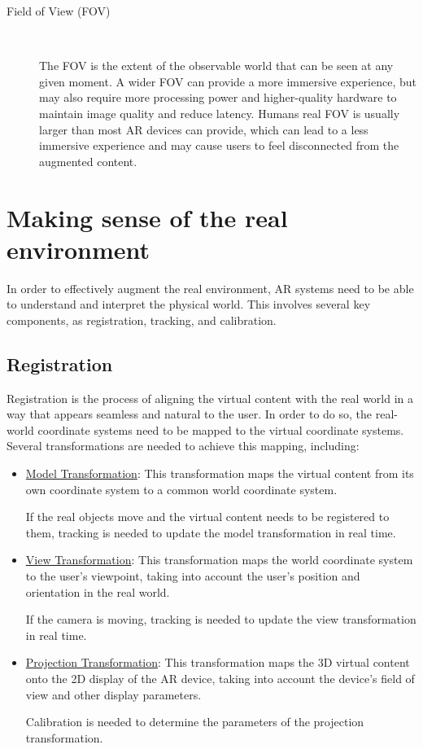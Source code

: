 \begin{description}
    \item[Field of View (FOV)]~
    
    The FOV is the extent of the observable world that can be seen at any given moment. A wider FOV can provide a more immersive experience, but may also require more processing power and higher-quality hardware to maintain image quality and reduce latency. Humans real FOV is usually larger than most AR devices can provide, which can lead to a less immersive experience and may cause users to feel disconnected from the augmented content.
\end{description}

\section{Making sense of the real environment}

In order to effectively augment the real environment, AR systems need to be able to understand and interpret the physical world. This involves several key components, as registration, tracking, and calibration.

\subsection{Registration}

Registration is the process of aligning the virtual content with the real world in a way that appears seamless and natural to the user. In order to do so, the real-world coordinate systems need to be mapped to the virtual coordinate systems. Several transformations are needed to achieve this mapping, including:
\begin{itemize}
    \item \ul{Model Transformation}: This transformation maps the virtual content from its own coordinate system to a common world coordinate system.
    
    If the real objects move and the virtual content needs to be registered to them, tracking is needed to update the model transformation in real time.
    \item \ul{View Transformation}: This transformation maps the world coordinate system to the user's viewpoint, taking into account the user's position and orientation in the real world.
    
    If the camera is moving, tracking is needed to update the view transformation in real time.
    \item \ul{Projection Transformation}: This transformation maps the 3D virtual content onto the 2D display of the AR device, taking into account the device's field of view and other display parameters.
    
    Calibration is needed to determine the parameters of the projection transformation.
\end{itemize}

